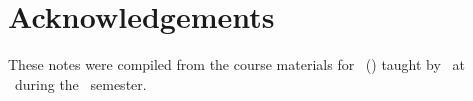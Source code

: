 \chapter*{Acknowledgements}
These notes were compiled from the course materials for \courseNumber\ (\courseTitle) taught by \courseInstructor\, at \universityLong\ during the \courseSemester\ semester.
